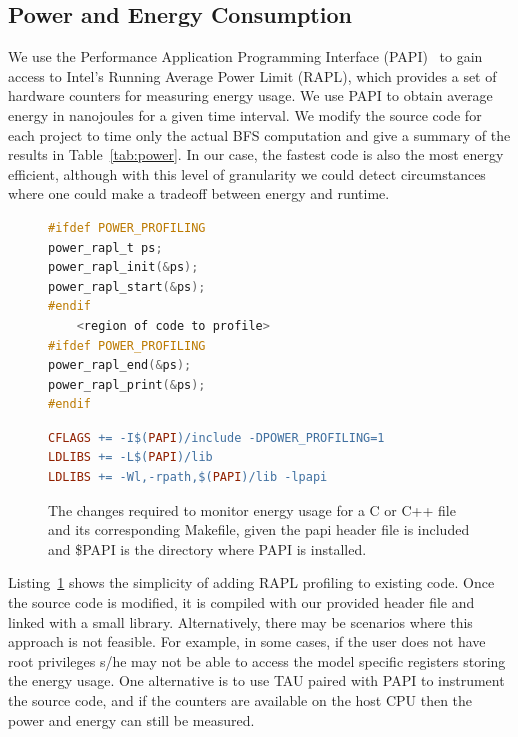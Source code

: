 \documentclass[conference]{IEEEtran}
\begin{document}
\subsection{Power and Energy Consumption}
We use the Performance Application Programming Interface (PAPI)~\cite{Browne:2000:PAPI} to gain access to Intel's Running Average Power Limit (RAPL), which provides a set of hardware counters for measuring energy usage. We use PAPI to obtain average energy in nanojoules for a given time interval. We modify the source code for each project to time only the actual BFS computation and give a summary of the results in Table~\ref{tab:power}. In our case, the fastest code is also the most energy efficient, although with this level of granularity we could detect circumstances where one could make a tradeoff between energy and runtime.
\begin{figure}
\begin{lstlisting}[language=C, frame=single]
#ifdef POWER_PROFILING
power_rapl_t ps;
power_rapl_init(&ps);
power_rapl_start(&ps);
#endif
	<region of code to profile>
#ifdef POWER_PROFILING
power_rapl_end(&ps);
power_rapl_print(&ps);
#endif
\end{lstlisting}
\begin{lstlisting}[language=make,  basicstyle=\footnotesize]
CFLAGS += -I$(PAPI)/include -DPOWER_PROFILING=1
LDLIBS += -L$(PAPI)/lib
LDLIBS += -Wl,-rpath,$(PAPI)/lib -lpapi
\end{lstlisting}
\caption{The changes required to monitor energy usage for a C or C++ file and its corresponding Makefile, given the papi header file is included and \$PAPI is the directory where PAPI is installed.}
\label{lst:RAPL}
\end{figure}

Listing~\ref{lst:RAPL} shows the simplicity of adding RAPL profiling to existing code. Once the source code is modified, it is compiled with our provided header file and linked with a small library. Alternatively, there may be scenarios where this approach is not feasible. For example, in some cases, if the user does not have root privileges s/he may not be able to access the model specific registers storing the energy usage. One alternative is to use TAU paired with PAPI to instrument the source code, and if the counters are available on the host CPU then the power and energy can still be measured.
\end{document}
